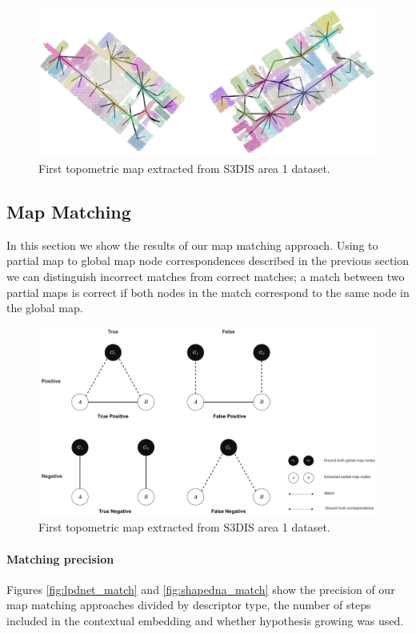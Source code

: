 \begin{figure}[h]
    \centering
    \includegraphics*[width=\textwidth]{./fig/area_1_topo.pdf}
    \caption{First topometric map extracted from S3DIS area 1 dataset.}
    \label{fig:area_1_topo_01}
\end{figure}

\subsection{Map Matching}
In this section we show the results of our map matching approach. Using to partial map to global map node correspondences described in the previous section we can distinguish incorrect matches from correct matches; a match between two partial maps is correct if both nodes in the match correspond to the same node in the global map. 

\begin{figure}[h]
    \centering
    \includegraphics*[width=\textwidth]{./fig/map_match_eval.drawio.pdf}
    \caption{First topometric map extracted from S3DIS area 1 dataset.}
    \label{fig:mapmatch_eval}
\end{figure}

\paragraph{Matching precision}
Figures \ref{fig:lpdnet_match} and \ref{fig:shapedna_match} show the precision of our map matching approaches divided by descriptor type, the number of steps included in the contextual embedding and whether hypothesis growing was used. 

